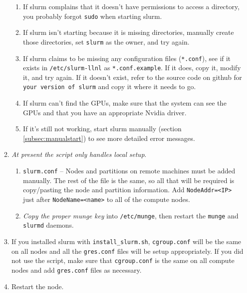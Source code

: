 \begin{enumerate}
\begin{enumerate}
	\item If slurm complains that it doesn't have permissions to access a directory, you probably forgot \texttt{sudo} when starting slurm.

	\item If slurm isn't starting because it is missing directories, manually create those directories, set \texttt{slurm} as the owner, and try again.

	\item If slurm claims to be missing any configuration files (\texttt{*.conf}), see if it exists in \texttt{/etc/slurm-llnl} as \texttt{*.conf.example}. If it does, copy it, modify it, and try again. If it doesn't exist, refer to the source code on github for \texttt{your version of slurm} and copy it where it needs to go.

	\item If slurm can't find the GPUs, make sure that the system can see the GPUs and that you have an appropriate Nvidia driver.

	\item If it's still not working, start slurm manually (section \ref{subsec:manualstart}) to see more detailed error messages. 
	\end{enumerate}

\item \emph{At present the script only handles local setup}. 

	\begin{enumerate}
	\item \texttt{slurm.conf} -- Nodes and partitions on remote machines must be added manually. The rest of the file is the same, so all that will be required is copy/pasting the node and partition information. Add \texttt{NodeAddr=<IP>} just after \texttt{NodeName=<name>} to all of the compute nodes.

	\item \emph{Copy the proper munge key} into \texttt{/etc/munge}, then restart the \texttt{munge} and \texttt{slurmd} daemons.
	\end{enumerate}

\item If you installed slurm with \texttt{install\_slurm.sh}, \texttt{cgroup.conf} will be the same on all nodes and all the \texttt{gres.conf} files will be setup appropriately. If you did not use the script, make sure that \texttt{cgroup.conf} is the same on all compute nodes and add \texttt{gres.conf} files as necessary.

\item Restart the node.


\end{enumerate}
